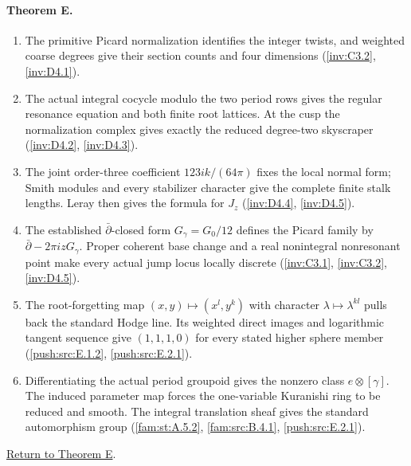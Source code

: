 \paragraph{Theorem E.}
\begin{enumerate}[label=\arabic*.]
\item\hypertarget{step-I-E-1}{} The primitive Picard
normalization identifies the integer twists, and weighted
coarse degrees give their section counts and four dimensions
(\hyperref[inv:C3.2]{\ref*{inv:C3.2}},
\hyperref[inv:D4.1]{\ref*{inv:D4.1}}).
\item\hypertarget{step-I-E-2}{} The actual integral cocycle
modulo the two period rows gives the regular resonance equation
and both finite root lattices.  At the cusp the normalization
complex gives exactly the reduced degree-two skyscraper
(\hyperref[inv:D4.2]{\ref*{inv:D4.2}},
\hyperref[inv:D4.3]{\ref*{inv:D4.3}}).
\item\hypertarget{step-I-E-3}{} The joint order-three
coefficient $123ik/(64\pi)$ fixes the local normal form;
Smith modules and every stabilizer character give the complete
finite stalk lengths.  Leray then gives the formula for $J_z$
(\hyperref[inv:D4.4]{\ref*{inv:D4.4}},
\hyperref[inv:D4.5]{\ref*{inv:D4.5}}).
\item\hypertarget{step-I-E-4}{} The established
$\bar\partial$-closed form $G_\gamma=G_0/12$ defines the
Picard family by $\bar\partial-2\pi izG_\gamma$.
Proper coherent base change and a real nonintegral nonresonant
point make every actual jump locus locally discrete
(\hyperref[inv:C3.1]{\ref*{inv:C3.1}},
\hyperref[inv:C3.2]{\ref*{inv:C3.2}},
\hyperref[inv:D4.5]{\ref*{inv:D4.5}}).
\item\hypertarget{step-I-E-5}{} The root-forgetting map
$(x,y)\mapsto(x^l,y^k)$ with character
$\lambda\mapsto\lambda^{kl}$ pulls back the standard Hodge
line.  Its weighted direct images and logarithmic tangent
sequence give $(1,1,1,0)$ for every stated higher sphere member
(\hyperref[push:src:E.1.2]{\ref*{push:src:E.1.2}},
\hyperref[push:src:E.2.1]{\ref*{push:src:E.2.1}}).
\item\hypertarget{step-I-E-6}{} Differentiating the actual
period groupoid gives the nonzero class $e\otimes[\gamma]$.
The induced parameter map forces the one-variable Kuranishi
ring to be reduced and smooth.  The integral translation sheaf
gives the standard automorphism group
(\hyperref[fam:st:A.5.2]{\ref*{fam:st:A.5.2}},
\hyperref[fam:src:B.4.1]{\ref*{fam:src:B.4.1}},
\hyperref[push:src:E.2.1]{\ref*{push:src:E.2.1}}).
\end{enumerate}
\hyperlink{main-I-E}{Return to Theorem E}.

